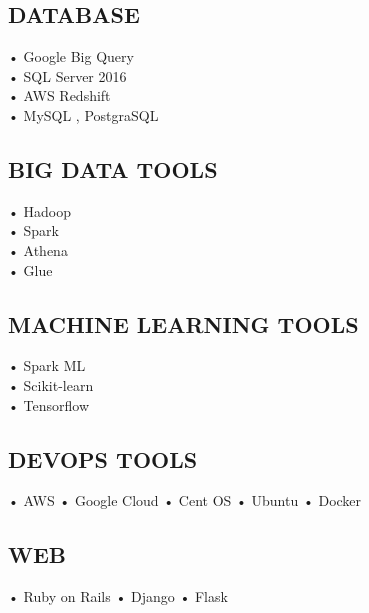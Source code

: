 \documentclass[letterpaper]{deedy-resume} %
\begin{document}
\begin{minipage}[t]{0.33\textwidth}
\subsection{DATABASE}
• Google Big Query \\
• SQL Server 2016 \\
• AWS Redshift \\
• MySQL , PostgraSQL
\sectionspace %

\subsection{BIG DATA TOOLS}
• Hadoop \\
• Spark \\
• Athena \\
• Glue \\
\sectionspace %

\subsection{MACHINE LEARNING TOOLS}
• Spark ML \\
• Scikit-learn \\
• Tensorflow \\

\sectionspace %

\subsection{DEVOPS TOOLS}
• AWS • Google Cloud • Cent OS •
Ubuntu • Docker

\sectionspace %

\subsection{WEB}
• Ruby on Rails • Django • Flask

\sectionspace %


\end{minipage} %
\hfill
%
\end{document}
